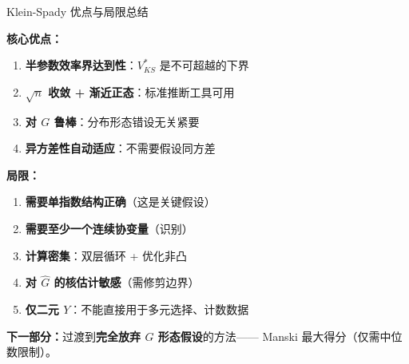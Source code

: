 \documentclass[aspectratio=169, 10pt]{beamer}
\begin{document}
\begin{frame}{Klein-Spady 优点与局限总结}

  \begin{highlightbox}
    \textbf{核心优点：}
    \begin{enumerate}\setlength{\itemsep}{1pt}
      \item \textbf{半参数效率界达到性}：$V^{*}_{KS}$ 是不可超越的下界
      \item \textbf{$\sqrt{n}$ 收敛 + 渐近正态}：标准推断工具可用
      \item \textbf{对 $G$ 鲁棒}：分布形态错设无关紧要
      \item \textbf{异方差性自动适应}：不需要假设同方差
    \end{enumerate}
  \end{highlightbox}

  \begin{keybox}
    \textbf{局限：}
    \begin{enumerate}\setlength{\itemsep}{1pt}
      \item \textbf{需要单指数结构正确}（这是关键假设）
      \item \textbf{需要至少一个连续协变量}（识别）
      \item \textbf{计算密集}：双层循环 + 优化非凸
      \item \textbf{对 $\hat G$ 的核估计敏感}（需修剪边界）
      \item \textbf{仅二元 $Y$}：不能直接用于多元选择、计数数据
    \end{enumerate}
  \end{keybox}

  \textbf{下一部分：}过渡到\textbf{完全放弃 $G$ 形态假设}的方法——
  Manski 最大得分（仅需中位数限制）。

\end{frame}
\end{document}
